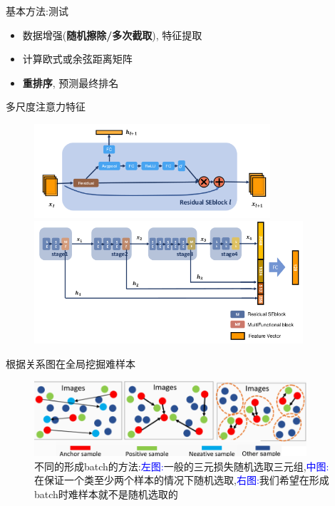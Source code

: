 \documentclass[notes]{beamer}
\begin{document}
\begin{frame}
	{基本方法:测试} 
	\begin{itemize}
		\item 数据增强({\bf 随机擦除/多次截取}), 特征提取
		\item 计算欧式或余弦距离矩阵
		\item {\bf 重排序}\cite{zhong2017reranking}, 预测最终排名
	\end{itemize}
\end{frame}


\begin{frame}
	{多尺度注意力特征}
	\begin{figure}
		\centering
		\includegraphics[width=0.78\textwidth]{2018-03-12-11-10-16.png} \\ 
		\includegraphics[width=0.89\textwidth]{2018-03-12-11-10-04.png} 
	\end{figure}
\end{frame}

\begin{frame}
	{根据关系图在全局挖掘难样本} 
	\begin{figure}
		\centering 
		\includegraphics[width=0.9\textwidth]{2018-03-12-11-21-00.png}	
		\caption{不同的形成batch的方法:\textcolor{blue}{左图:}一般的三元损失随机选取三元组,\textcolor{blue}{中图:}\cite{hermans2017defense}在保证一个类至少两个样本的情况下随机选取,\textcolor{blue}{右图:}我们希望在形成batch时难样本就不是随机选取的}
	\end{figure}
\end{frame}
\end{document}
